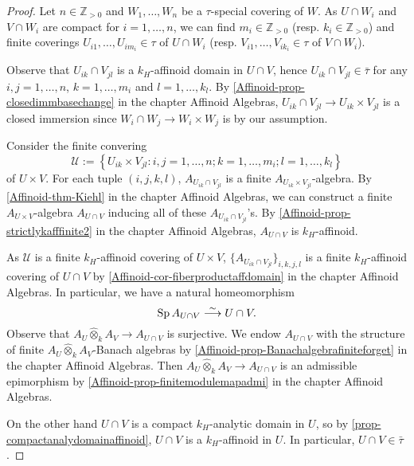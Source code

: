 \begin{proof}
    Let $n\in \mathbb{Z}_{>0}$ and $W_1,\ldots,W_n$ be a $\tau$-special covering of $W$.
    As $U\cap W_i$ and $V\cap W_i$ are compact for $i=1,\ldots,n$, we can find $m_i\in \mathbb{Z}_{>0}$ (resp. $k_i\in \mathbb{Z}_{>0}$) and finite coverings $U_{i1},\ldots,U_{im_i}\in \tau$ of $U\cap W_i$ (resp. $V_{i1},\ldots,V_{ik_i}\in \tau$ of $V\cap W_i$). 

    Observe that $U_{ik}\cap V_{jl}$ is a $k_H$-affinoid domain in $U\cap V$, hence $U_{ik}\cap V_{jl}\in \bar{\tau}$ for any $i,j=1,\ldots,n$, $k=1,\ldots,m_i$ and $l=1,\ldots,k_l$. By \cref{Affinoid-prop-closedimmbasechange} in the chapter Affinoid Algebras, $U_{ik}\cap V_{jl}\rightarrow U_{ik}\times V_{jl}$ is a closed immersion since $W_i\cap W_j\rightarrow W_i\times W_j$ is by our assumption. 
    
    Consider the finite convering 
    \[
        \mathcal{U}:=\left\{U_{ik}\times V_{jl}:i,j=1,\ldots,n; k=1,\ldots,m_i; l=1,\ldots,k_l \right\}
    \]
    of $U\times V$. For each tuple $(i,j,k,l)$, $A_{U_{ik}\cap V_{jl}}$ is a finite $A_{U_{ik}\times V_{jl}}$-algebra. By \cref{Affinoid-thm-Kiehl} in the chapter Affinoid Algebras, we can construct a finite $A_{U\times V}$-algebra $A_{U\cap V}$ inducing all of these $A_{U_{ik}\cap V_{jl}}$'s. By \cref{Affinoid-prop-strictlykafffinite2} in the chapter Affinoid Algebras, $A_{U\cap V}$ is $k_H$-affinoid.

    As $\mathcal{U}$ is a finite $k_H$-affinoid covering of $U\times V$, $\{A_{U_{ik}\cap V_{jl}}\}_{i,k,j,l}$ is a finite $k_H$-affinoid covering of $U\cap V$ by \cref{Affinoid-cor-fiberproductaffdomain} in the chapter Affinoid Algebras.
    In particular, we have a natural homeomorphism
    \[
        \operatorname{Sp} A_{U\cap V}\stackrel{\sim}{\longrightarrow} U\cap V.  
    \]
    Observe that $A_U\hat{\otimes}_k A_V \rightarrow A_{U\cap V}$ is surjective. We endow $A_{U\cap V}$ with the structure of finite $A_U\hat{\otimes}_k A_V$-Banach algebras by \cref{Affinoid-prop-Banachalgebrafiniteforget} in the chapter Affinoid Algebras. Then $A_U\hat{\otimes}_k A_V \rightarrow A_{U\cap V}$ is an admissible epimorphism by \cref{Affinoid-prop-finitemodulemapadmi} in the chapter Affinoid Algebras.

    On the other hand $U\cap V$ is a compact $k_H$-analytic domain in $U$, so by \cref{prop-compactanalydomainaffinoid}, $U\cap V$ is a $k_H$-affinoid in $U$. In particular, $U\cap V\in \bar{\tau}$.
\end{proof}

